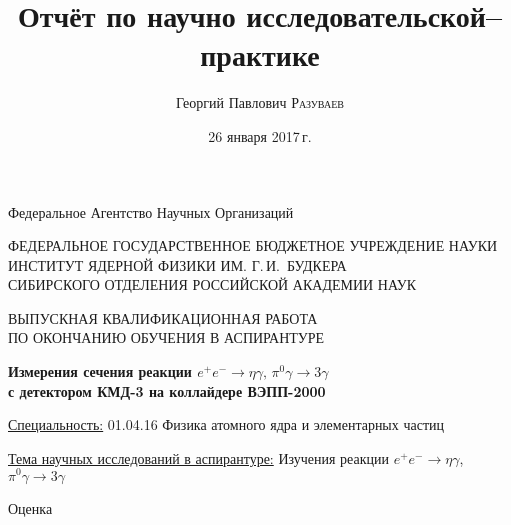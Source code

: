 \documentclass[14pt,a4paper]{extarticle}
\title{Отчёт по научно исследовательской--практике}%
\author{Георгий Павлович \textsc{Разуваев}} %
\date{26 января 2017\,г.} %
\begin{document}

\begin{titlepage}

\begin{center}

Федеральное Агентство Научных Организаций

\vspace{.5cm}

ФЕДЕРАЛЬНОЕ ГОСУДАРСТВЕННОЕ БЮДЖЕТНОЕ УЧРЕЖДЕНИЕ НАУКИ \\
ИНСТИТУТ ЯДЕРНОЙ ФИЗИКИ ИМ. Г.\,И.~БУДКЕРА \\
СИБИРСКОГО ОТДЕЛЕНИЯ РОССИЙСКОЙ АКАДЕМИИ НАУК

\vspace{2cm}

ВЫПУСКНАЯ КВАЛИФИКАЦИОННАЯ РАБОТА\\
ПО ОКОНЧАНИЮ ОБУЧЕНИЯ В АСПИРАНТУРЕ


\vspace{1.5cm}

\boldmath
\textbf{Измерения сечения реакции
$e^+ e^- \to \eta \gamma, \, \pi^0 \gamma \to 3 \gamma$\\
с детектором КМД-3 на коллайдере ВЭПП-2000}
\unboldmath


\end{center}

\vspace{2cm}

\underline{Специальность:} 01.04.16 Физика атомного ядра и элементарных частиц

\vspace{.5cm}

\underline{Тема научных исследований в аспирантуре:} Изучения реакции $e^+ e^- \to \eta \gamma$,
$\pi^0 \gamma \to 3 \gamma$

\vspace{2cm}

\begin{minipage}[t]{0.5\textwidth}
\hspace{3cm}
\end{minipage}
\begin{minipage}[t]{0.5\textwidth}
Оценка \underline{\hspace{3cm}}
\end{minipage}



\end{titlepage}
\end{document}
